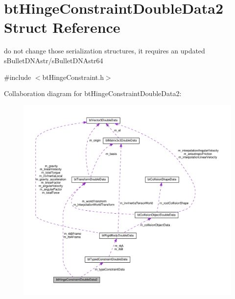\hypertarget{structbtHingeConstraintDoubleData2}{}\section{bt\+Hinge\+Constraint\+Double\+Data2 Struct Reference}
\label{structbtHingeConstraintDoubleData2}


do not change those serialization structures, it requires an updated s\+Bullet\+D\+N\+Astr/s\+Bullet\+D\+N\+Astr64  




{\ttfamily \#include $<$bt\+Hinge\+Constraint.\+h$>$}



Collaboration diagram for bt\+Hinge\+Constraint\+Double\+Data2\+:
\nopagebreak
\begin{figure}[H]
\begin{center}
\leavevmode
\includegraphics[width=350pt]{structbtHingeConstraintDoubleData2__coll__graph}
\end{center}
\end{figure}

